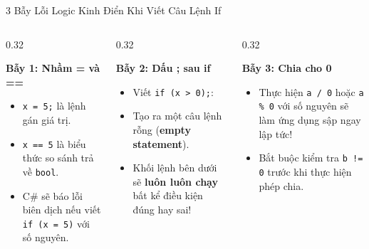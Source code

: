 \documentclass[aspectratio=169, 10pt]{beamer}
\begin{document}
\begin{frame}[fragile]{3 Bẫy Lỗi Logic Kinh Điển Khi Viết Câu Lệnh If}
  \begin{columns}[T]
    \begin{column}{0.32\textwidth}
      \begin{alertblock}{\textbf{Bẫy 1: Nhầm = và ==}}
        \begin{itemize}
          \item \texttt{x = 5;} là lệnh gán giá trị.
          \item \texttt{x == 5} là biểu thức so sánh trả về \texttt{bool}.
          \item C\# sẽ báo lỗi biên dịch nếu viết \texttt{if (x = 5)} với số nguyên.
        \end{itemize}
      \end{alertblock}
    \end{column}
    \begin{column}{0.32\textwidth}
      \begin{alertblock}{\textbf{Bẫy 2: Dấu ; sau if}}
        \begin{itemize}
          \item Viết \texttt{if (x > 0);}:
          \item Tạo ra một câu lệnh rỗng (\textbf{empty statement}).
          \item Khối lệnh bên dưới sẽ \textbf{luôn luôn chạy} bất kể điều kiện đúng hay sai!
        \end{itemize}
      \end{alertblock}
    \end{column}
    \begin{column}{0.32\textwidth}
      \begin{alertblock}{\textbf{Bẫy 3: Chia cho 0}}
        \begin{itemize}
          \item Thực hiện \texttt{a / 0} hoặc \texttt{a \% 0} với số nguyên sẽ làm ứng dụng sập ngay lập tức!
          \item Bắt buộc kiểm tra \texttt{b != 0} trước khi thực hiện phép chia.
        \end{itemize}
      \end{alertblock}
    \end{column}
  \end{columns}
\end{frame}
\end{document}
